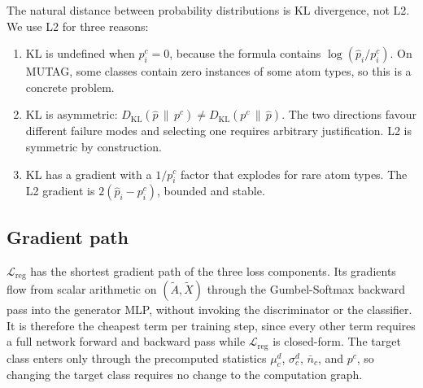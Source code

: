 \documentclass[12pt,a4paper]{article}
\begin{document}
The natural distance between probability distributions is KL divergence, not L2. We use L2 for three reasons:
\begin{enumerate}[nosep]
  \item KL is undefined when $p_i^c = 0$, because the formula contains $\log(\hat{p}_i / p_i^c)$. On MUTAG, some classes contain zero instances of some atom types, so this is a concrete problem.
  \item KL is asymmetric: $D_{\text{KL}}(\hat{p} \,\|\, p^c) \neq D_{\text{KL}}(p^c \,\|\, \hat{p})$. The two directions favour different failure modes and selecting one requires arbitrary justification. L2 is symmetric by construction.
  \item KL has a gradient with a $1/p_i^c$ factor that explodes for rare atom types. The L2 gradient is $2(\hat{p}_i - p_i^c)$, bounded and stable.
\end{enumerate}

\subsection{Gradient path}

$\mathcal{L}_{\text{reg}}$ has the shortest gradient path of the three loss components. Its gradients flow from scalar arithmetic on $(\tilde{A}, \tilde{X})$ through the Gumbel-Softmax backward pass into the generator MLP, without invoking the discriminator or the classifier. It is therefore the cheapest term per training step, since every other term requires a full network forward and backward pass while $\mathcal{L}_{\text{reg}}$ is closed-form. The target class enters only through the precomputed statistics $\mu^d_c$, $\sigma^d_c$, $\bar{n}_c$, and $p^c$, so changing the target class requires no change to the computation graph.
\end{document}
